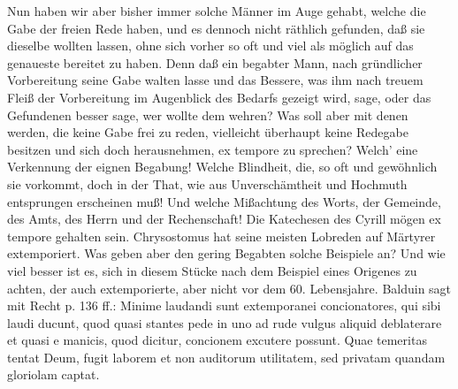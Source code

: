 Nun haben wir aber bisher immer solche Männer im Auge gehabt, welche die Gabe der freien Rede haben, und es dennoch nicht räthlich gefunden, daß sie dieselbe wollten lassen, ohne sich vorher so oft und viel als möglich auf das genaueste bereitet zu haben. Denn daß ein begabter Mann, nach gründlicher Vorbereitung seine Gabe walten lasse und das Bessere, was ihm nach treuem Fleiß der Vorbereitung im Augenblick des Bedarfs gezeigt wird, sage, oder das Gefundenen
besser sage, wer wollte dem wehren? Was soll aber mit denen werden, die keine Gabe frei zu reden, vielleicht überhaupt keine Redegabe besitzen und sich doch herausnehmen, ex tempore zu sprechen? Welch’ eine Verkennung der eignen Begabung! Welche Blindheit, die, so oft und gewöhnlich sie vorkommt, doch in der That, wie aus Unverschämtheit und Hochmuth entsprungen erscheinen muß! Und welche Mißachtung des Worts, der Gemeinde, des Amts, des Herrn und der Rechenschaft! Die Katechesen des Cyrill mögen ex tempore gehalten sein. Chrysostomus hat seine meisten Lobreden auf Märtyrer extemporiert. Was geben aber den gering Begabten solche Beispiele an? Und wie viel besser ist es, sich in diesem Stücke nach dem Beispiel eines Origenes zu achten, der auch extemporierte, aber nicht vor dem 60. Lebensjahre. Balduin sagt mit Recht p. 136 ff.: Minime laudandi sunt extemporanei concionatores, qui sibi laudi ducunt, quod quasi stantes pede in uno ad rude vulgus aliquid deblaterare et quasi e manicis, quod dicitur, concionem excutere possunt. Quae temeritas tentat Deum, fugit laborem et non auditorum utilitatem, sed privatam quandam gloriolam captat.

